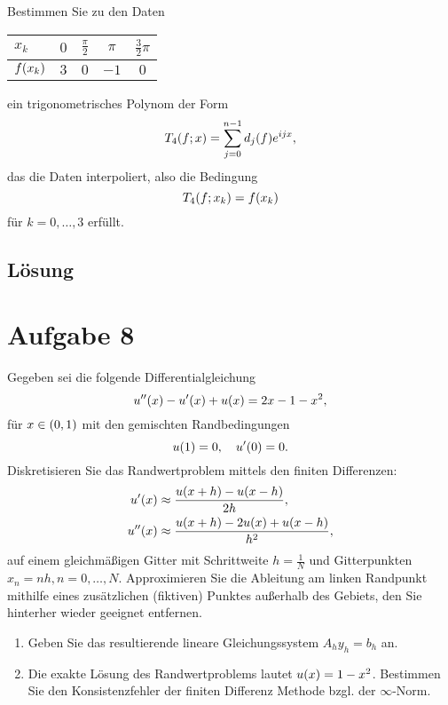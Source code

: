 \documentclass{exercise}
\begin{document}
    \begin{problem}
        Bestimmen Sie zu den Daten
        \begin{center}
            \begin{tabular}{lcccc}
                \toprule
                \(x_k\) & \(0\) & \(\frac{\pi}{2}\) & \(\pi\) & \(\frac{3}{2}\pi\)\\
                \midrule
                \(f\parentheses*{x_k}\) & \(3\) & \(0\) & \(-1\) & \(0\)\\
            \end{tabular}
        \end{center}
        ein trigonometrisches Polynom der Form
        \[
            T_4\parentheses*{f; x} = \sum_{j = 0}^{n - 1}d_j\parentheses*{f}e^{ijx},
        \]
        das die Daten interpoliert, also die Bedingung
        \[
            T_4\parentheses*{f; x_k} = f\parentheses*{x_k}
        \]
        für \(k = 0, \ldots, 3\) erfüllt.
    \end{problem}

    \subsection*{Lösung}


    \section*{Aufgabe 8}

    \begin{problem}
        Gegeben sei die folgende Differentialgleichung
        \[
            u''\parentheses*{x} - u'\parentheses*{x} + u\parentheses*{x} = 2x - 1 - x^2,
        \]
        für \(x \in \parentheses*{0, 1}\) mit den gemischten Randbedingungen
        \[
            u\parentheses*{1} = 0, \quad u'\parentheses*{0} = 0.
        \]
        Diskretisieren Sie das Randwertproblem mittels den finiten Differenzen:
        \begin{align*}
            u'\parentheses*{x} &\approx \frac{u\parentheses*{x + h} - u\parentheses*{x - h}}{2h},\\
            u''\parentheses*{x} &\approx \frac{u\parentheses*{x + h} - 2u\parentheses*{x} + u\parentheses*{x - h}}{h^2},
        \end{align*}
        auf einem gleichmäßigen Gitter mit Schrittweite \(h = \frac{1}{N}\) und Gitterpunkten \(x_n = nh, n = 0, \ldots, N\).
        Approximieren Sie die Ableitung am linken Randpunkt mithilfe eines zusätzlichen (fiktiven) Punktes außerhalb des Gebiets, den Sie hinterher wieder geeignet entfernen.
        \begin{enumerate}
            \item Geben Sie das resultierende lineare Gleichungssystem \(A_h y_h = b_h\) an.
            \item Die exakte Lösung des Randwertproblems lautet \(u\parentheses*{x} = 1 - x^2\).
            Bestimmen Sie den Konsistenzfehler der finiten Differenz Methode bzgl. der \(\infty\)-Norm.
        \end{enumerate}
    \end{problem}
\end{document}
